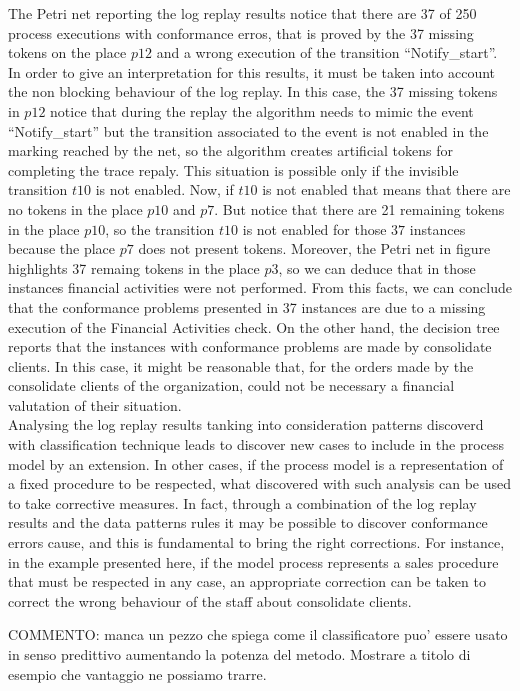 \documentclass[11pt]{article}
\begin{document}
The Petri net reporting the log replay results notice that there are 37 of 250 process executions with conformance erros, that is proved by the 37 missing tokens on the place $p12$ and a wrong execution of the transition ``Notify\_start''. In order to give an interpretation for this results, it must be taken into account the non blocking behaviour of the log replay. In this case, the 37 missing tokens in $p12$ notice that during the replay the algorithm needs to mimic the event ``Notify\_start'' but the transition associated to the event is not enabled in the marking reached by the net, so the algorithm creates artificial tokens for completing the trace repaly. This situation is possible only if the invisible transition $t10$ is not enabled. Now, if $t10$ is not enabled that means that there are no tokens in the place $p10$ and $p7$. But notice that there are 21 remaining tokens in the place $p10$, so the transition $t10$ is not enabled for those $37$ instances because the place $p7$ does not present tokens. Moreover, the Petri net in figure highlights 37 remaing tokens in the place $p3$, so we can deduce that in those instances financial activities were not performed. From this facts, we can conclude that the conformance problems presented in  37 instances are due to a missing execution of the Financial Activities check. On the other hand, the decision tree reports that the instances with conformance problems are made by consolidate clients. In this case, it might be reasonable that, for the orders made by the consolidate clients of the organization, could not be necessary a financial valutation of their situation.\\

Analysing the log replay results tanking into consideration patterns discoverd with classification technique leads to discover new cases to include in the process model by an extension. In other cases, if the process model is a representation of a fixed procedure to be respected, what discovered with such analysis can be used to take corrective measures. In fact, through a combination of the log replay results and the data patterns rules it may be possible to discover conformance errors cause, and this is fundamental to bring the right corrections. For instance, in the example presented here, if the model process represents a sales procedure that must be respected in any case, an appropriate correction can be taken to correct the wrong behaviour of the staff about consolidate clients. 

COMMENTO: manca un pezzo che spiega come il classificatore puo' essere usato in senso predittivo aumentando la potenza del metodo. Mostrare a titolo di esempio che vantaggio ne possiamo trarre.
\end{document}
